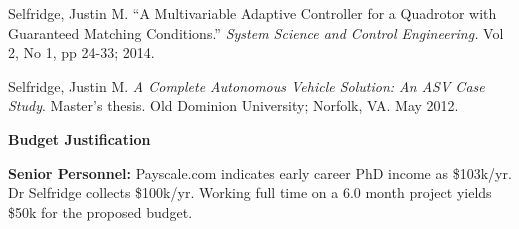 \documentclass[11pt]{article}
\newcommand{\PubSpace}{\vspace{-0.12cm}}  %
\begin{document}
\PubSpace
Selfridge, Justin M.
``A Multivariable Adaptive Controller for a Quadrotor with Guaranteed Matching Conditions.''
\emph{System Science and Control Engineering.}
Vol 2, No 1, pp 24-33; 2014.

\PubSpace
Selfridge, Justin M.
\emph{A Complete Autonomous Vehicle Solution: An ASV Case Study}.
Master's thesis.
Old Dominion University; Norfolk, VA.
May 2012.








\newpage
{\bf \Huge Budget Justification}


{\bf Senior Personnel:} Payscale.com indicates early career PhD income as \$103k/yr.  Dr Selfridge collects \$100k/yr.  Working full time on a 6.0 month project yields \$50k for the proposed budget.
\end{document}
